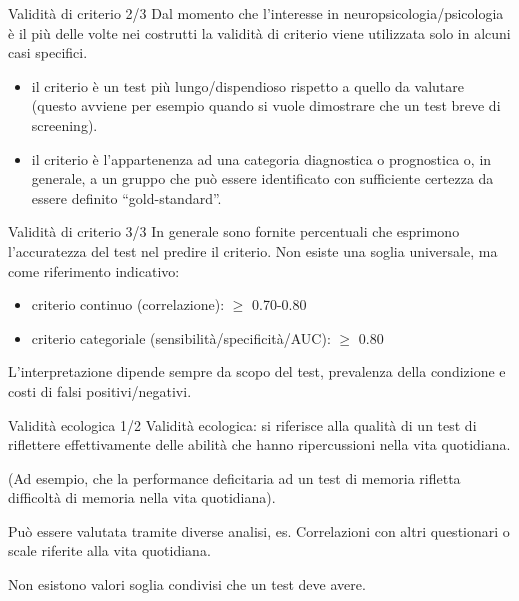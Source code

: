\documentclass[
  ignorenonframetext,
  aspectratio=169,
]{beamer}
\providecommand{\tightlist}{%
  \setlength{\itemsep}{0pt}\setlength{\parskip}{0pt}}
\begin{document}
\begin{frame}{Validità di criterio 2/3}
\label{validituxe0-di-criterio-23}
Dal momento che l'interesse in neuropsicologia/psicologia è il più delle
volte nei costrutti la validità di criterio viene utilizzata solo in
alcuni casi specifici.

\begin{itemize}
\tightlist
\item
  il criterio è un test più lungo/dispendioso rispetto a quello da
  valutare (questo avviene per esempio quando si vuole dimostrare che un
  test breve di screening).
\item
  il criterio è l'appartenenza ad una categoria diagnostica o
  prognostica o, in generale, a un gruppo che può essere identificato
  con sufficiente certezza da essere definito ``gold-standard''.
\end{itemize}
\end{frame}

\begin{frame}{Validità di criterio 3/3}
\label{validituxe0-di-criterio-33}
In generale sono fornite percentuali che esprimono l'accuratezza del
test nel predire il criterio. Non esiste una soglia universale, ma come
riferimento indicativo:

\begin{itemize}
\tightlist
\item
  criterio continuo (correlazione): \(\geq\) 0.70-0.80
\item
  criterio categoriale (sensibilità/specificità/AUC): \(\geq\) 0.80
\end{itemize}

L'interpretazione dipende sempre da scopo del test, prevalenza della
condizione e costi di falsi positivi/negativi.
\end{frame}

\begin{frame}{Validità ecologica 1/2}
\label{validituxe0-ecologica-12}
Validità ecologica: si riferisce alla qualità di un test di riflettere
effettivamente delle abilità che hanno ripercussioni nella vita
quotidiana.

(Ad esempio, che la performance deficitaria ad un test di memoria
rifletta difficoltà di memoria nella vita quotidiana).

Può essere valutata tramite diverse analisi, es. Correlazioni con altri
questionari o scale riferite alla vita quotidiana.

Non esistono valori soglia condivisi che un test deve avere.
\end{frame}
\end{document}

